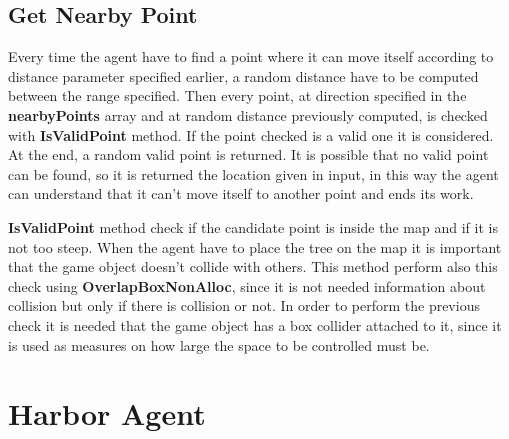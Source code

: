 \documentclass[12pt]{article}
\begin{document}
    \subsection{Get Nearby Point} \label{section:nearbyPoint}
    Every time the agent have to find a point where it can move itself according to distance parameter specified earlier, a random distance have to be computed between the range specified.
    Then every point, at direction specified in the \textbf{nearbyPoints} array and at random distance previously computed, is checked with \textbf{IsValidPoint} method. If the point 
    checked is a valid one it is considered. At the end, a random valid point is returned. It is possible that no valid point can be found, so it is returned the location given in input,
    in this way the agent can understand that it can't move itself to another point and ends its work.
    
    \textbf{IsValidPoint} method check if the candidate point is inside the map and if it is not too steep. When the agent have to place the tree on the map it is important that 
    the game object doesn't collide with others. This method perform also this check using \textbf{OverlapBoxNonAlloc}, since it is not needed information about collision but only
    if there is collision or not. In order to perform the previous check it is needed that the game object has a box collider attached to it, since it is used 
    as measures on how large the space to be controlled must be.
 
    \section{Harbor Agent}
\end{document}
